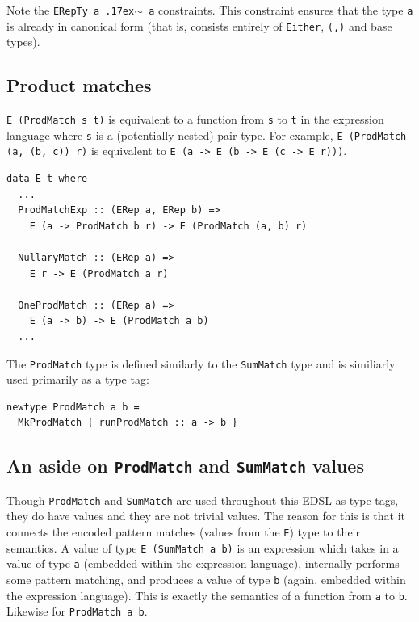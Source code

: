 \documentclass[runningheads, a4paper]{llncs}
\newcommand{\typeeq}{\raise.17ex\hbox{$\scriptstyle\mathtt{\sim}$}\,\;}
\newcommand{\ttt}{\texttt}
\begin{document}
\noindent Note the \ttt{ERepTy a \typeeq a} constraints. This constraint ensures that the type
\ttt{a} is already in canonical form (that is, consists entirely of
\ttt{Either}, \ttt{(,)} and base types).

\subsection{Product matches}

\ttt{E (ProdMatch s t)} is equivalent to a function from \ttt{s} to
\ttt{t} in the expression language where \ttt{s} is a (potentially
nested) pair type. For example, \ttt{E (ProdMatch (a, (b, c)) r)} is
equivalent to \ttt{E (a -> E (b -> E (c -> E r)))}.

\begin{lstlisting}
data E t where
  ...
  ProdMatchExp :: (ERep a, ERep b) =>
    E (a -> ProdMatch b r) -> E (ProdMatch (a, b) r)

  NullaryMatch :: (ERep a) =>
    E r -> E (ProdMatch a r)

  OneProdMatch :: (ERep a) =>
    E (a -> b) -> E (ProdMatch a b)
  ...
\end{lstlisting}

The \ttt{ProdMatch} type is defined similarly to the \ttt{SumMatch} type and is
similiarly used primarily as a type tag:

\begin{lstlisting}
newtype ProdMatch a b =
  MkProdMatch { runProdMatch :: a -> b }
\end{lstlisting}


\subsection{An aside on \ttt{ProdMatch} and \ttt{SumMatch} values}
\label{sec:MatchAside}

Though \ttt{ProdMatch} and \ttt{SumMatch} are used throughout this EDSL as type
tags, they do have values and they are not trivial values. The reason for this
is that it connects the encoded pattern matches (values from the \ttt{E}) type
to their semantics. A value of type \ttt{E (SumMatch a b)} is an expression
which takes in a value of type \ttt{a} (embedded within the expression
language), internally performs some pattern matching, and produces a value of
type \ttt{b} (again, embedded within the expression language). This is exactly
the semantics of a function from \ttt{a} to \ttt{b}. Likewise for \ttt{ProdMatch a b}.
\end{document}
